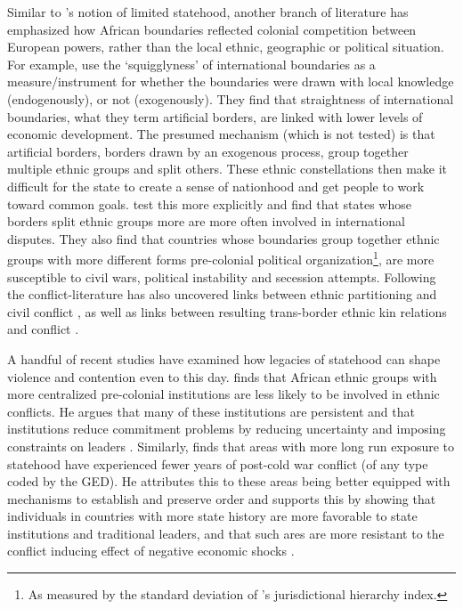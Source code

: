
Similar to \citet{Clapham1996}'s notion of limited statehood, another branch of
literature has emphasized how African boundaries reflected colonial competition
between European powers, rather than the local ethnic, geographic or political
situation. For example, \citet{Alesina2011} use the `squigglyness' of international
boundaries as a measure/instrument for whether the boundaries were drawn with
local knowledge (endogenously), or not (exogenously). They find that
straightness of international boundaries, what they term artificial borders, are
linked with lower levels of economic development. The presumed mechanism (which
is not tested) is that artificial borders, borders drawn by an exogenous
process, group together multiple ethnic groups and split others. These ethnic
constellations then make it difficult for the state to create a sense of
nationhood and get people to work toward common goals. \citet{Englebert2002}
test this more explicitly and find that states whose borders split ethnic
groups more are more often involved in international disputes. They also find
that countries whose boundaries group together ethnic groups with more different
forms pre-colonial political organization\footnote{As measured by the standard
deviation of \citet{Murdock1967}'s jurisdictional hierarchy index.}, are more
susceptible to civil wars, political instability and secession attempts.
Following \citet{Englebert2002} the conflict-literature has also uncovered links
between ethnic partitioning and civil conflict \citep{Ito2020,
Michalopoulos2016}, as well as links between resulting trans-border ethnic kin
relations and conflict \citep{Cederman2013, Salehyan2009, Weidmann2015}. 

A handful of recent studies have examined how legacies of statehood can shape
violence and contention even to this day. \citet{Wig2016} finds that African
ethnic groups with more centralized pre-colonial institutions are less likely to
be involved in ethnic conflicts. He argues that many of these institutions are
persistent and that institutions reduce commitment problems by reducing
uncertainty and imposing constraints on leaders \citep{Wig2016}. Similarly,
\citet{Depetris-Chauvin2016} finds that areas with more long run exposure to
statehood have experienced fewer years of post-cold war conflict (of any type
coded by the GED). He attributes this to these areas being better equipped with mechanisms to
establish and preserve order and supports this by showing that individuals in
countries with more state history are more favorable to state institutions and
traditional leaders, and that such ares are more resistant to the conflict
inducing effect of negative economic shocks \citep{Depetris-Chauvin2016}.

